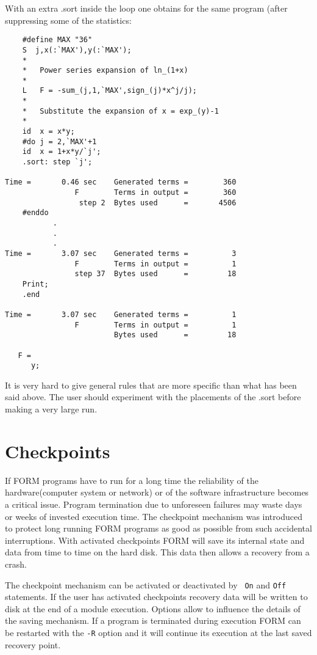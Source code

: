 With an extra .sort inside the loop one obtains for the same program (after 
suppressing some of the statistics:
\begin{verbatim}
    #define MAX "36"
    S  j,x(:`MAX'),y(:`MAX');
    *
    *	Power series expansion of ln_(1+x)
    *
    L	F = -sum_(j,1,`MAX',sign_(j)*x^j/j);
    *
    *	Substitute the expansion of x = exp_(y)-1
    *
    id	x = x*y;
    #do j = 2,`MAX'+1
    id	x = 1+x*y/`j';
    .sort: step `j';

Time =       0.46 sec    Generated terms =        360
                F        Terms in output =        360
                 step 2  Bytes used      =       4506
    #enddo
           .
           .
           .
Time =       3.07 sec    Generated terms =          3
                F        Terms in output =          1
                step 37  Bytes used      =         18
    Print;
    .end

Time =       3.07 sec    Generated terms =          1
                F        Terms in output =          1
                         Bytes used      =         18

   F =
      y;
\end{verbatim}
It is very hard to give general rules that are more specific than what has 
been said above. The user should experiment with the placements of the .sort 
before making a very large run. 

\section{Checkpoints}
\label{checkpoints}

If FORM programs have to run for a long time the 
reliability of the hardware(computer system or network) or of the software 
infrastructure becomes a critical issue. Program 
termination due to unforeseen failures may waste days or 
weeks of invested execution time. The checkpoint mechanism was introduced 
to protect long running FORM programs as good as possible from such 
accidental interruptions. With activated checkpoints FORM will save its 
internal state and data from time to time on the hard disk. This data then 
allows a recovery from a crash.

The checkpoint mechanism can be activated or deactivated by {\tt 
On} and {\tt Off} statements. If the user has 
activated checkpoints recovery data will be written to disk 
at the end of a module execution. Options allow to influence the details of 
the saving mechanism. If a program is terminated during execution FORM can 
be restarted with the {\tt -R} option and it will continue its execution at 
the last saved recovery point.

